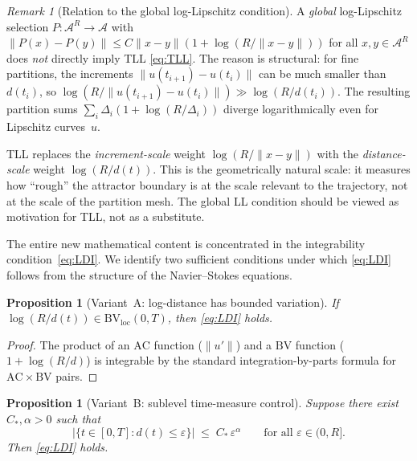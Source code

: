 \documentclass[12pt,a4paper]{article}
\theoremstyle{definition}
\theoremstyle{plain}
\newtheorem{proposition}[definition]{Proposition}
\theoremstyle{remark}
\newtheorem{remark}[definition]{Remark}
\begin{document}
\begin{remark}[Relation to the global log-Lipschitz condition]
\label{rem:global-LL}
A \emph{global} log-Lipschitz selection
$P : \mathcal{A}^R \to \mathcal{A}$ with
$\|P(x)-P(y)\| \le C\|x-y\|(1+\log(R/\|x-y\|))$
for all $x,y \in \mathcal{A}^R$ does \emph{not} directly imply TLL
\eqref{eq:TLL}.  The reason is structural: for fine partitions,
the increments $\|u(t_{i+1})-u(t_i)\|$ can be much smaller than
$d(t_i)$, so $\log(R/\|u(t_{i+1})-u(t_i)\|) \gg \log(R/d(t_i))$.
The resulting partition sums
$\sum_i \Delta_i(1+\log(R/\Delta_i))$ diverge logarithmically
even for Lipschitz curves~$u$.

TLL replaces the \emph{increment-scale} weight
$\log(R/\|x-y\|)$ with the \emph{distance-scale} weight
$\log(R/d(t))$.  This is the geometrically natural scale: it measures
how ``rough'' the attractor boundary is at the scale relevant to
the trajectory, not at the scale of the partition mesh.
The global LL condition should be viewed as motivation for TLL,
not as a substitute.
\end{remark}

The entire new mathematical content is concentrated in the
integrability condition~\eqref{eq:LDI}.  We identify two
sufficient conditions under which \eqref{eq:LDI} follows from
the structure of the Navier--Stokes equations.

\begin{proposition}[Variant~A: log-distance has bounded variation]
\label{prop:LDI-A}
If $\log(R/d(t)) \in \mathrm{BV}_{\mathrm{loc}}(0,T)$, then
\eqref{eq:LDI} holds.
\end{proposition}

\begin{proof}
The product of an $\mathrm{AC}$ function ($\|u'\|$) and a $\mathrm{BV}$
function ($1 + \log(R/d)$) is integrable by the standard
integration-by-parts formula for $\mathrm{AC}\times\mathrm{BV}$ pairs.
\end{proof}

\begin{proposition}[Variant~B: sublevel time-measure control]
\label{prop:LDI-B}
Suppose there exist $C_*, \alpha > 0$ such that
\begin{equation}\label{eq:STC}
  \bigl|\{t \in [0,T] : d(t) \le \varepsilon\}\bigr|
  \;\le\;
  C_*\,\varepsilon^\alpha
  \qquad \text{for all } \varepsilon \in (0, R].
  \tag{STC}
\end{equation}
Then \eqref{eq:LDI} holds.
\end{proposition}
\end{document}
